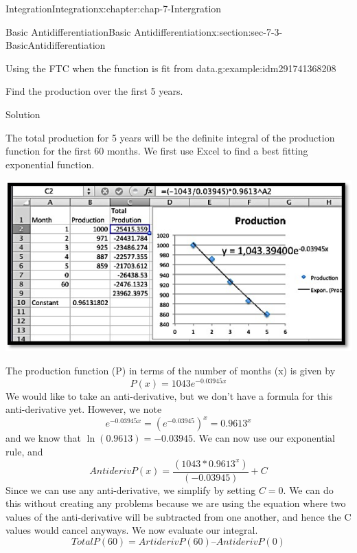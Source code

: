 \documentclass[oneside,10pt,]{book}
\numberwithin{equation}{section}
\begin{document}
\begin{chapterptx}{Integration}{}{Integration}{}{}{x:chapter:chap-7-Intergration}
\begin{sectionptx}{Basic Antidifferentiation}{}{Basic Antidifferentiation}{}{}{x:section:sec-7-3-BasicAntidifferentiation}
\begin{example}{Using the FTC when the function is fit from data.}{g:example:idm291741368208}
\begin{sidebyside}{1}{0}{0}{0}
\begin{sbspanel}{1}
\end{sbspanel}%
\end{sidebyside}%
\par
Find the production over the first 5 years.%
\par
Solution%
\par
The total production for 5 years will be the definite integral of the production function for the first 60 months.  We first use Excel to find a best fitting exponential function.%
\begin{sidebyside}{1}{0.1}{0.1}{0}%
\begin{sbspanel}{0.8}%
\includegraphics[width=\linewidth]{images/sec7-3-1.png}
\end{sbspanel}%
\end{sidebyside}%
\par
The production function (P) in terms of the number of months (x) is given by%
%
\begin{equation*}
P(x)=1043 e^{-0.03945 x}
\end{equation*}
We would like to take an anti-derivative, but we don’t have a formula for this anti-derivative yet.  However, we note%
%
\begin{equation*}
e^{-0.03945 x}=  (e^{-0.03945} )^x=0.9613^x
\end{equation*}
and we know that \(\ln (0.9613)=-0.03945\). We can now use our exponential rule, and%
%
\begin{equation*}
AntiderivP(x)=\frac{(1043*0.9613^x)}{(-0.03945)}+C
\end{equation*}
Since we can use any anti-derivative, we simplify by setting \(C = 0\). We can do this without creating any problems because we are using the equation where two values of the anti-derivative will be subtracted from one another, and hence the C values would cancel anyways. We now evaluate our integral.%
%
\begin{equation*}
TotalP(60)= ArtiderivP(60)– AntiderivP(0)

\end{equation*}
\end{example}
\end{sectionptx}
\end{chapterptx}
\end{document}
